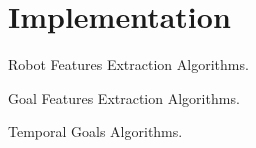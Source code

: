\section{Implementation}

\begin{frame}{Robot Features Extraction}
    Algorithms.
\end{frame}

\begin{frame}{Goal Features Extraction}
    Algorithms.
\end{frame}

\begin{frame}{Temporal Goals}
    Algorithms.
\end{frame}
